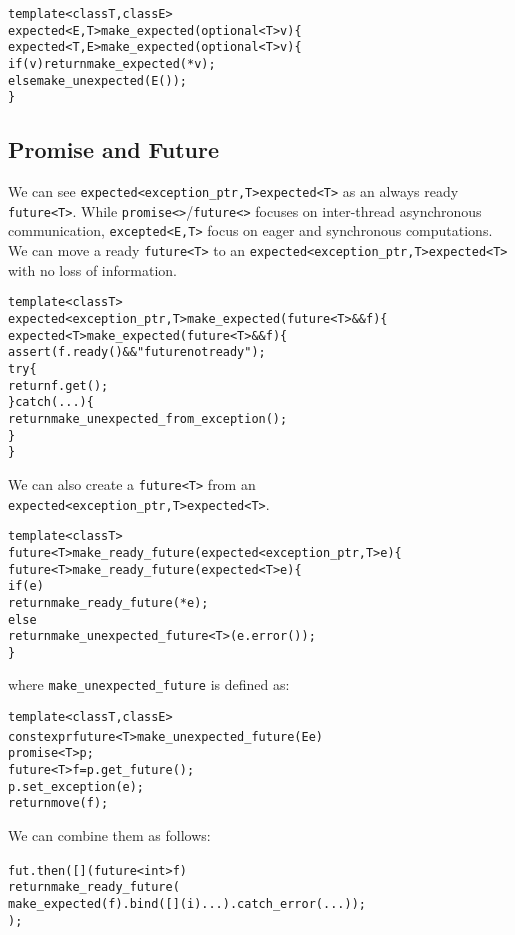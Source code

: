 \documentclass[a4paper,10pt]{article}
\newcommand{\cpp}[1]{\lstinline{#1}}
\newcommand{\suppress}[1]{\colorbox{suppress_color}{#1}}
\newcommand{\update}[1]{\colorbox{update_color}{#1}}
\begin{document}
\begin{alltt}
template <class T, class E>
\suppress{expected<E,T> make_expected(optional<T> v) \{}
\update{expected<T,E> make_expected(optional<T> v) \{}
  if (v) return make_expected(*v);
  else make_unexpected(E());
\}
\end{alltt}

\subsection{Promise and Future}

We can see \suppress{\cpp{expected<exception_ptr,T>}}\update{\cpp{expected<T>}} as an always ready \cpp{future<T>}. While \cpp{promise<>}/\cpp{future<>} focuses on inter-thread asynchronous communication, \cpp{excepted<E,T>} focus on eager and synchronous computations.
We can move a ready \cpp{future<T>} to an \suppress{\cpp{expected<exception_ptr,T>}}\update{\cpp{expected<T>}} with no loss of information. 

\begin{alltt}
template <class T>
\suppress{expected<exception_ptr,T> make_expected(future<T>&& f) \{}
\update{expected<T> make_expected(future<T>&& f) \{}
  assert (f.ready() && "future not ready");
  try \{
    return f.get();
  \} catch (...) \{
    return make_unexpected_from_exception();
  \}
\}
\end{alltt}
\noindent
We can also create a \cpp{future<T>} from an \suppress{\cpp{expected<exception_ptr,T>}}\update{\cpp{expected<T>}}.

\begin{alltt}
template <class T>
\suppress{future<T> make_ready_future(expected<exception_ptr,T> e) \{}
\update{future<T> make_ready_future(expected<T> e) \{}
  if (e) 
    return make_ready_future(*e);
  else 
    return make_unexpected_future<T>(e.error()); 
\}
\end{alltt}
\noindent
where \cpp{make_unexpected_future} is defined as:

\begin{alltt}
template <class T, class E>
constexpr future<T> make_unexpected_future(E e)  {
  promise<T> p;
  future<T> f = p.get_future();
  p.set_exception(e);
  return move(f);
}
\end{alltt}
\noindent
We can combine them as follows:

\begin{alltt}
fut.then([](future<int> f) { 
  return make_ready_future(
    make_expected(f).bind([](i){ ... }).catch_error(...));
  });
\end{alltt}
\end{document}
